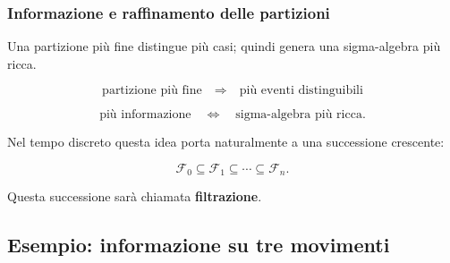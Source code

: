 \documentclass[handout]{beamer}%
\providecommand{\F}{\mathcal{F}}
\providecommand{\1}{\mathbf{1}}
\providecommand{\QTR}[2]{\csname #1\endcsname{#2}}
\begin{document}
\begin{frame}%
%

\frametitle{Informazione e raffinamento delle partizioni}%


Una partizione pi\`{u} fine distingue pi\`{u} casi; quindi genera una
sigma-algebra pi\`{u} ricca.

\medskip%

\[
\text{partizione pi\`{u} fine} \quad\Longrightarrow\quad\text{pi\`{u} eventi
distinguibili}
\]


\medskip%

\[
\text{pi\`{u} informazione} \quad\Longleftrightarrow\quad\text{sigma-algebra
pi\`{u} ricca}.
\]


\medskip

Nel tempo discreto questa idea porta naturalmente a una successione crescente:%

\[
\F_{0}\subseteq\F_{1}\subseteq\cdots\subseteq\F_{n}.
\]


\medskip

Questa successione sar\`{a} chiamata \textbf{filtrazione}.%

\transboxout
\end{frame}%




\subsection{Esempio: informazione su tre movimenti}%
\end{document}
